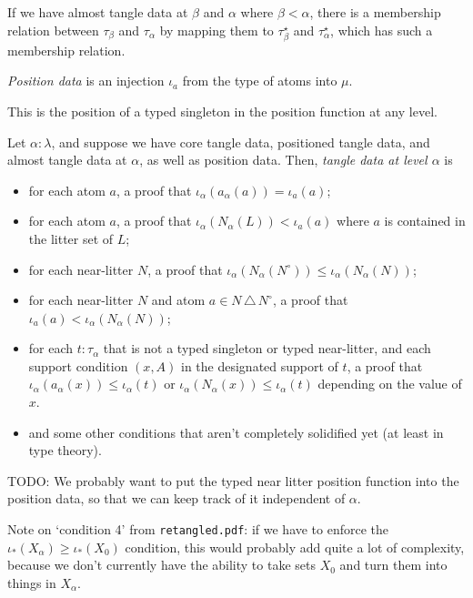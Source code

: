 \documentclass{article}
\begin{document}
\begin{definition}
    If we have almost tangle data at \( \beta \) and \( \alpha \) where \( \beta < \alpha \), there is a membership relation between \( \tau_\beta \) and \( \tau_\alpha \) by mapping them to \( \tau_\beta^\star \) and \( \tau_\alpha^\star \), which has such a membership relation.
\end{definition}
\begin{definition}
    \emph{Position data} is an injection \( \iota_a \) from the type of atoms into \( \mu \).
\end{definition}
\begin{remark}
    This is the position of a typed singleton in the position function at any level.
\end{remark}
\begin{definition}
    Let \( \alpha : \lambda \), and suppose we have core tangle data, positioned tangle data, and almost tangle data at \( \alpha \), as well as position data.
    Then, \emph{tangle data at level \( \alpha \)} is
    \begin{itemize}
        \item for each atom \( a \), a proof that \( \iota_\alpha(a_\alpha(a)) = \iota_a(a) \);
        \item for each atom \( a \), a proof that \( \iota_\alpha(N_\alpha(L)) < \iota_a(a) \) where \( a \) is contained in the litter set of \( L \);
        \item for each near-litter \( N \), a proof that \( \iota_\alpha(N_\alpha(N^\circ)) \leq \iota_\alpha(N_\alpha(N)) \);
        \item for each near-litter \( N \) and atom \( a \in N\,\triangle\,N^\circ \), a proof that \( \iota_a(a) < \iota_\alpha(N_\alpha(N)) \);
        \item for each \( t : \tau_\alpha \) that is not a typed singleton or typed near-litter, and each support condition \( (x,A) \) in the designated support of \( t \), a proof that \( \iota_\alpha(a_\alpha(x)) \leq \iota_\alpha(t) \) or \( \iota_\alpha(N_\alpha(x)) \leq \iota_\alpha(t) \) depending on the value of \( x \).
        \item and some other conditions that aren't completely solidified yet (at least in type theory).
    \end{itemize}
    TODO: We probably want to put the typed near litter position function into the position data, so that we can keep track of it independent of \( \alpha \).

    Note on `condition 4' from \texttt{retangled.pdf}: if we have to enforce the \( \iota_\ast(X_\alpha) \geq \iota_\ast(X_0) \) condition, this would probably add quite a lot of complexity, because we don't currently have the ability to take sets \( X_0 \) and turn them into things in \( X_\alpha \).
\end{definition}
\end{document}

